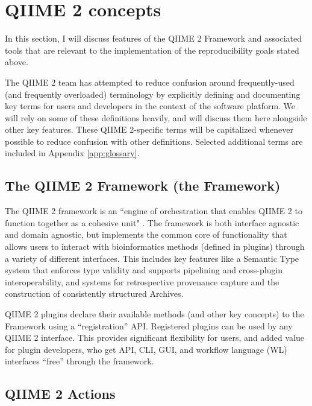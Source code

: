 \section{QIIME 2 concepts}

In this section, I will discuss features of the QIIME 2 Framework and associated
tools that are relevant to the implementation of the reproducibility goals
stated above. 

The QIIME 2 team has attempted to reduce confusion around frequently-used (and
frequently overloaded) terminology by explicitly defining and documenting key
terms for users \parencite{qiime_2_development_team_glossary_2016} and
developers \parencite{qiime_2_development_team_glossary_2018} in the context of
the software platform.  We will rely on some of these definitions heavily, and
will discuss them here alongside other key features. These QIIME 2-specific
terms will be capitalized whenever possible to reduce confusion with other
definitions. Selected additional terms are included in Appendix \ref{app:glossary}.

\subsection{The QIIME 2 Framework (the Framework)}

The QIIME 2 framework is an “engine of orchestration that enables QIIME 2 to
function together as a cohesive unit" \parencite{qiime_2_development_team_glossary_2018}.
The framework is both interface agnostic and domain agnostic, but implements the
common core of functionality that allows users to interact with bioinformatics
methods (defined in plugins) through a variety of different interfaces. This
includes key features like a Semantic Type system that enforces type validity
and supports pipelining and cross-plugin interoperability, and systems for
retrospective provenance capture and the construction of consistently structured
Archives.

QIIME 2 plugins declare their available methods (and other key concepts) to the
Framework using a “registration” API. Registered plugins can be used by any
QIIME 2 interface. This provides significant flexibility for users, and added
value for plugin developers, who get API, CLI, GUI, and workflow language (WL)
interfaces “free” through the framework.

\subsection{QIIME 2 Actions}

